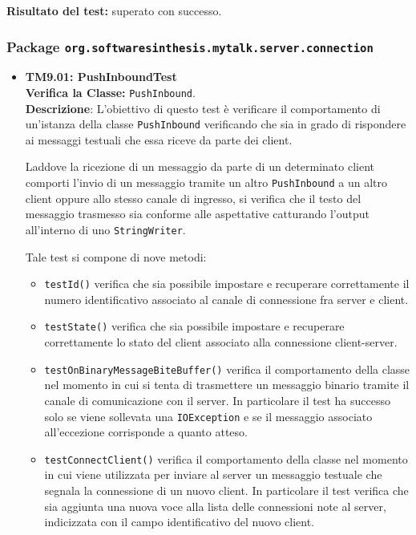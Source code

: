 \begin{itemize}
\begin{itemize}
\end{itemize}
\textbf{Risultato del test:} superato con successo.

\end{itemize}


\subsubsection{Package \texttt{org.softwaresinthesis.mytalk.server.connection}}
\begin{itemize}

\item \textbf{TM9.01: PushInboundTest}\\
\textbf{Verifica la Classe:} \texttt{PushInbound}.\\
\textbf{Descrizione}: L'obiettivo di questo test è verificare il comportamento di un'istanza della classe \texttt{PushInbound} verificando che sia in grado di rispondere ai messaggi testuali che essa riceve da parte dei client.

Laddove la ricezione di un messaggio da parte di un determinato client comporti l'invio di un messaggio tramite un altro \texttt{PushInbound} a un altro client oppure allo stesso canale di ingresso, si verifica che il testo del messaggio trasmesso sia conforme alle aspettative catturando l'output all'interno di uno \texttt{StringWriter}.
 
Tale test si compone di nove metodi:
\begin{itemize}

\item \texttt{testId()} verifica che sia possibile impostare e recuperare correttamente il numero identificativo associato al canale di connessione fra server e client.

\item \texttt{testState()} verifica che sia possibile impostare e recuperare correttamente lo stato del client associato alla connessione client-server.

\item \texttt{testOnBinaryMessageBiteBuffer()} verifica il comportamento della classe nel momento in cui si tenta di trasmettere un messaggio binario tramite il canale di comunicazione con il server. In particolare il test ha successo solo se viene sollevata una \texttt{IOException} e se il messaggio associato all'eccezione corrisponde a quanto atteso.

\item \texttt{testConnectClient()} verifica il comportamento della classe nel momento in cui viene  utilizzata per inviare al server un messaggio testuale che segnala la connessione di un nuovo client. In particolare il test verifica che sia aggiunta una nuova voce alla lista delle connessioni note al server, indicizzata con il campo identificativo del nuovo client.


\end{itemize}
\end{itemize}
